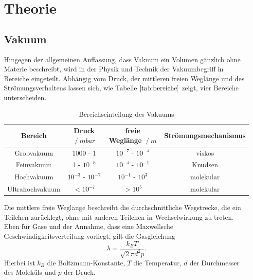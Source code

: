 \section{Theorie}
\subsection{Vakuum}
Hingegen der allgemeinen Auffassung, dass Vakuum ein Volumen gänzlich ohne Materie beschreibt, wird in der Physik und Technik
der Vakuumbegriff in Bereiche eingeteilt.
Abhängig vom Druck, der mittleren freien Weglänge und des Strömungsverhaltens lassen sich, wie Tabelle $\ref{tab:bereiche}$ zeigt, vier Bereiche unterscheiden.

\begin{table}[!hht]
\begin{tabular}{c c c c}
 Bereich & Druck $\:/\: mbar$ & freie Weglänge $\:/\: m$ & Strömungsmechanismus \\
 \midrule
 Grobvakuum & 1000 - 1 & $10^{-7}$ - $10^{-4}$ & viskos \\
 Feinvakuum & 1 - $10^{-5}$ & $10^{-4}$ - $10^{-1}$ & Knudsen \\
 Hochvakuum & $10^{-3}$ - $10^{-7}$ & $10^{-1}$ - $10^3$ & molekular \\
 Ultrahochvakuum & $< 10^{-7}$ & $> 10^3$ & molekular \\
\end{tabular}
\caption{Bereichseinteilung des Vakuums}
\label{tab:bereiche}
\end{table}

Die mittlere freie Weglänge beschreibt die durchschnittliche Wegstrecke, die ein Teilchen zurücklegt, ohne mit anderen Teilchen in Wechselwirkung zu treten.
Eben für Gase und der Annahme, dass eine Maxwellsche Geschwindigkeitsverteilung vorliegt, gilt die Gasgleichung
\begin{equation}
  \lambda = \frac{k_B T}{\sqrt{2}\pi d^2p}.
\end{equation}
Hierbei ist $k_B$ die Boltzmann-Konstante, $T$ die Temperatur, $d$ der Durchmesser des Moleküls und $p$ der Druck.
